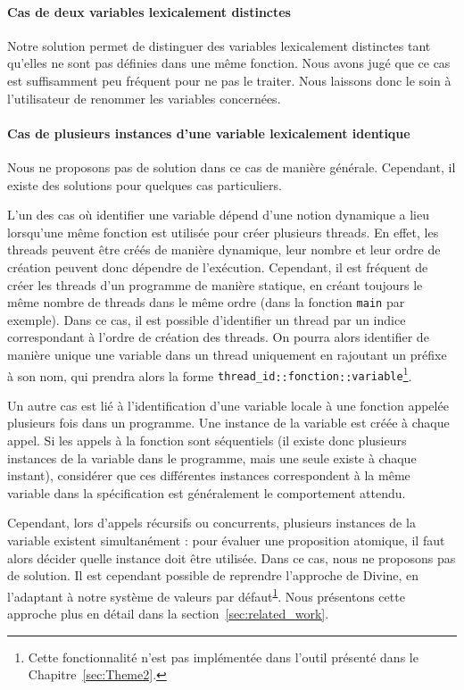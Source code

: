 \paragraph{Cas de deux variables lexicalement distinctes}
Notre solution permet de distinguer des variables lexicalement distinctes tant
qu'elles ne sont pas définies dans une même fonction. Nous avons jugé que ce cas
est suffisamment peu fréquent pour ne pas le traiter. Nous laissons donc le soin
à l'utilisateur de renommer les variables concernées.

\paragraph{Cas de plusieurs instances d'une variable lexicalement identique}
Nous ne proposons pas de solution dans ce cas de manière générale. Cependant,
il existe des solutions pour quelques cas particuliers.

L'un des cas où identifier une variable dépend d'une notion dynamique a lieu
lorsqu’une même fonction est utilisée pour créer plusieurs threads. En effet,
les threads peuvent être créés de manière dynamique, leur nombre et leur ordre
de création peuvent donc dépendre de l'exécution. Cependant, il est fréquent de
créer les threads d'un programme de manière statique, en créant toujours le même
nombre de threads dans le même ordre (dans la fonction \texttt{main} par
exemple). Dans ce cas, il est possible d'identifier un thread par un indice
correspondant à l'ordre de création des threads. On pourra alors identifier de
manière unique une variable dans un thread uniquement en rajoutant un préfixe à
son nom, qui prendra alors la forme
\texttt{{thread\_id}::{fonction}::{variable}}\footnote{\label{fn:notimplemented}
Cette fonctionnalité n'est pas implémentée dans l'outil présenté dans le
Chapitre~\ref{sec:Theme2}.}.

Un autre cas est lié à l'identification d'une variable locale à une fonction
appelée plusieurs fois dans un programme. Une instance de la variable est créée
à chaque appel. Si les appels à la fonction sont séquentiels (il
existe donc plusieurs instances de la variable dans le programme, mais une seule
existe à chaque instant), considérer que ces différentes instances correspondent
à la même variable dans la spécification est généralement le comportement
attendu.

Cependant, lors d'appels récursifs ou concurrents, plusieurs instances de la
variable existent simultanément : pour évaluer une proposition atomique, il
faut alors décider quelle instance doit être utilisée. Dans ce cas, nous ne
proposons pas de solution. Il est cependant possible de reprendre l'approche de
Divine\cite{Divine_LTL}, en l'adaptant à notre système de valeurs par
défaut\textsuperscript{\ref{fn:notimplemented}}. Nous présentons cette approche
plus en détail dans la section~\ref{sec:related_work}.

